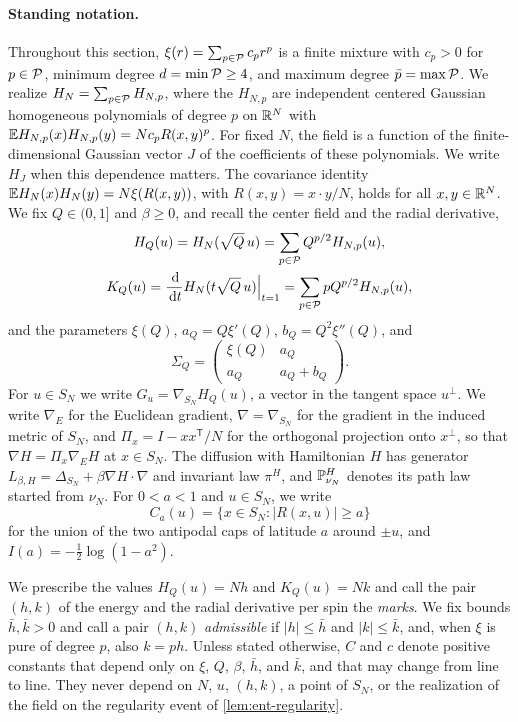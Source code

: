 \paragraph{Standing notation.}
Throughout this section, $\xi(r)=\sum_{p\in\mathcal P}c_pr^p$ is a finite mixture
with $c_p>0$ for $p\in\mathcal P$, minimum degree $d=\min\mathcal P\ge4$, and maximum
degree $\bar p=\max\mathcal P$. We realize $H_N=\sum_{p\in\mathcal P}H_{N,p}$, where the
$H_{N,p}$ are independent centered Gaussian homogeneous polynomials of degree
$p$ on $\mathbb R^N$ with $\mathbb E H_{N,p}(x)H_{N,p}(y)=Nc_pR(x,y)^p$. For fixed $N$,
the field is a function of the finite-dimensional Gaussian vector $J$ of the
coefficients of these polynomials. We write $H_J$ when this dependence
matters. The covariance identity $\mathbb E H_N(x)H_N(y)=N\xi(R(x,y))$, with
$R(x,y)=x\cdot y/N$, holds for all $x,y\in\mathbb R^N$. We fix $Q\in(0,1]$ and
$\beta\ge0$, and recall the center field and the radial derivative,
\begin{equation}\label{eq:ent-center}
 \begin{gathered}
 H_Q(u)=H_N(\sqrt Q\,u)=\sum_{p\in\mathcal P}Q^{p/2}H_{N,p}(u),\\
 K_Q(u)=\frac{\,\mathrm d}{\,\mathrm d t}H_N(t\sqrt Q\,u)\Big|_{t=1}
       =\sum_{p\in\mathcal P}pQ^{p/2}H_{N,p}(u),
 \end{gathered}
\end{equation}
and the parameters $\xi(Q)$, $a_Q=Q\xi'(Q)$, $b_Q=Q^2\xi''(Q)$, and
\[
 \Sigma_Q=\begin{pmatrix}\xi(Q)&a_Q\\ a_Q&a_Q+b_Q\end{pmatrix}.
\]
For $u\in S_N$ we write $G_u=\nabla_{S_N}H_Q(u)$, a vector in the tangent
space $u^\perp$. We write $\nabla_E$ for the Euclidean gradient,
$\nabla=\nabla_{S_N}$ for the gradient in the induced metric of $S_N$, and
$\Pi_x=I-xx^{\mathsf T}/N$ for the orthogonal projection onto $x^\perp$,
so that $\nabla H=\Pi_x\nabla_EH$ at $x\in S_N$. The diffusion with
Hamiltonian $H$ has generator $L_{\beta,H}=\Delta_{S_N}+\beta\nabla H\cdot
\nabla$ and invariant law $\pi^H$, and $\mathbb P^H_{\nu_N}$ denotes its path law
started from $\nu_N$. For $0<a<1$ and $u\in S_N$, we write
\[
 C_a(u)=\{x\in S_N:|R(x,u)|\ge a\}
\]
for the union of the two antipodal caps of latitude $a$ around $\pm u$, and
$I(a)=-\frac12\log(1-a^2)$.

We prescribe the values $H_Q(u)=Nh$ and $K_Q(u)=Nk$ and call the pair
$(h,k)$ of the energy and the radial derivative per spin the \emph{marks}. We fix bounds $\bar h,\bar k>0$ and call a pair $(h,k)$
\emph{admissible} if $|h|\le\bar h$ and $|k|\le\bar k$, and, when $\xi$ is
pure of degree $p$, also $k=ph$. Unless stated otherwise, $C$ and $c$ denote
positive constants that depend only on $\xi$, $Q$, $\beta$, $\bar h$, and
$\bar k$, and that may change from line to line. They never depend on $N$,
$u$, $(h,k)$, a point of $S_N$, or the realization of the field on the
regularity event of \cref{lem:ent-regularity}.

